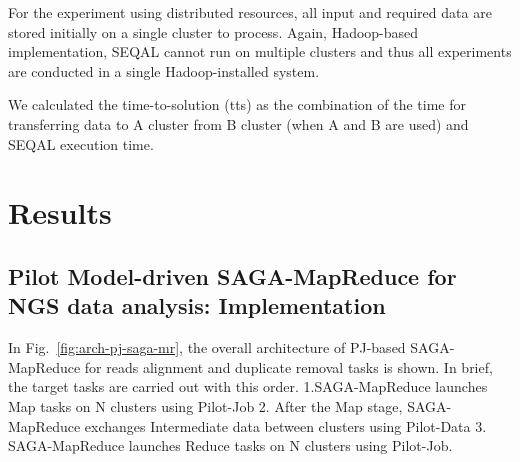 \documentclass{sig-alternate}
\begin{document}
For the experiment using distributed resources, all input and required data are stored initially on a single cluster to process.  Again, Hadoop-based implementation, SEQAL cannot run on multiple clusters and thus all experiments are conducted in a single Hadoop-installed system.

We calculated the time-to-solution (tts) as the combination of the time for transferring data to A cluster from B cluster (when A and B are used) and SEQAL execution time. 
 


\section{Results}

\subsection{Pilot Model-driven SAGA-MapReduce for NGS data analysis: Implementation}
In Fig.~\ref{fig:arch-pj-saga-mr}, the overall architecture of PJ-based SAGA-MapReduce for reads alignment and duplicate removal tasks is shown.  In brief, the target tasks are carried out with this order. 1.SAGA-MapReduce launches Map tasks on N clusters using Pilot-Job 2. After the Map stage, SAGA-MapReduce exchanges Intermediate data between clusters using Pilot-Data  3. SAGA-MapReduce launches Reduce tasks on N clusters using Pilot-Job.
\end{document}
